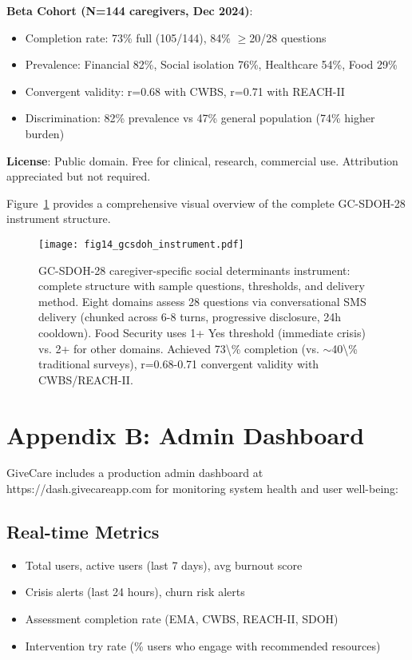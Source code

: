 \documentclass{article}
\begin{document}
\textbf{Beta Cohort (N=144 caregivers, Dec 2024)}:
\begin{itemize}
    \item Completion rate: 73\% full (105/144), 84\% $\geq$20/28 questions
    \item Prevalence: Financial 82\%, Social isolation 76\%, Healthcare 54\%, Food 29\%
    \item Convergent validity: r=0.68 with CWBS, r=0.71 with REACH-II
    \item Discrimination: 82\% prevalence vs 47\% general population (74\% higher burden)
\end{itemize}

\textbf{License}: Public domain. Free for clinical, research, commercial use. Attribution appreciated but not required.

Figure~\ref{fig:gcsdoh_visual} provides a comprehensive visual overview of the complete GC-SDOH-28 instrument structure.

%
\begin{figure}[htbp]%
\centering%
\texttt{[image: fig14\_gcsdoh\_instrument.pdf]}%
\caption{GC-SDOH-28 caregiver-specific social determinants instrument: complete structure with sample questions, thresholds, and delivery method. Eight domains assess 28 questions via conversational SMS delivery (chunked across 6-8 turns, progressive disclosure, 24h cooldown). Food Security uses 1+ Yes threshold (immediate crisis) vs. 2+ for other domains. Achieved 73\textbackslash{}\% completion (vs. $\sim$40\textbackslash{}\% traditional surveys), r=0.68-0.71 convergent validity with CWBS/REACH-II.}%
\label{fig:gcsdoh_visual}%
\end{figure}%
\section*{Appendix B: Admin Dashboard}

GiveCare includes a production admin dashboard at https://dash.givecareapp.com for monitoring system health and user well-being:

\subsection*{Real-time Metrics}
\begin{itemize}
    \item Total users, active users (last 7 days), avg burnout score
    \item Crisis alerts (last 24 hours), churn risk alerts
    \item Assessment completion rate (EMA, CWBS, REACH-II, SDOH)
    \item Intervention try rate (\% users who engage with recommended resources)
\end{itemize}
\end{document}
